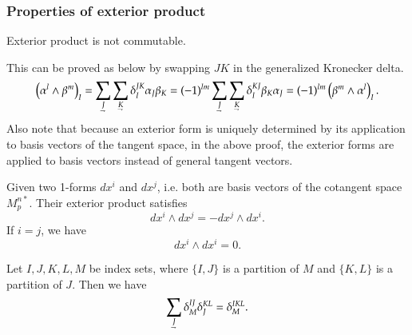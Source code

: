 \documentclass[11pt, a4paper]{book}
\begin{document}
\subsubsection{Properties of exterior product}

\begin{Proposition}
  Exterior product is not commutable.
\end{Proposition}

\begin{Proof}
  This can be proved as below by swapping $JK$ in the generalized Kronecker delta.
  \begin{equation}
    \left( \alpha^l\wedge\beta^m \right)_I =
    \sum_{\underaccent{\rightharpoondown}{J}}\sum_{\underaccent{\rightharpoondown}{K}}
    \delta_I^{JK}\alpha_J\beta_K =
    (-1)^{lm}\sum_{\underaccent{\rightharpoondown}{J}}\sum_{\underaccent{\rightharpoondown}{K}}
    \delta_I^{KJ}\beta_K\alpha_J = (-1)^{lm} \left( \beta^m\wedge\alpha^l \right)_I.
  \end{equation}
  Also note that because an exterior form is uniquely determined by its application to basis
  vectors of the tangent space, in the above proof, the exterior forms are applied to
  basis vectors instead of general tangent vectors.
\end{Proof}

\begin{Example}
  Given two 1-forms $dx^i$ and $dx^j$, i.e. both are basis vectors of the cotangent
  space $M_p^{n*}$. Their exterior product satisfies
  \begin{equation}
    \label{eq:exterior-product-antisymmetry}
    dx^i \wedge dx^j = -dx^j \wedge dx^i.
  \end{equation}
  If $i=j$, we have
  \begin{equation}
    dx^i \wedge dx^i = 0.
  \end{equation}
\end{Example}

\begin{Lemma}
  Let $I,J,K,L,M$ be index sets, where $\{I, J\}$ is a partition of $M$ and $\{K,L\}$ is a
  partition of $J$. Then we have
  \begin{equation}
    \label{eq:kronecker-delta-reduction}
    \sum_{\underaccent{\rightharpoondown}{J}}\delta_M^{IJ}\delta_J^{KL} = \delta_M^{IKL}.
  \end{equation}
\end{Lemma}
\end{document}
